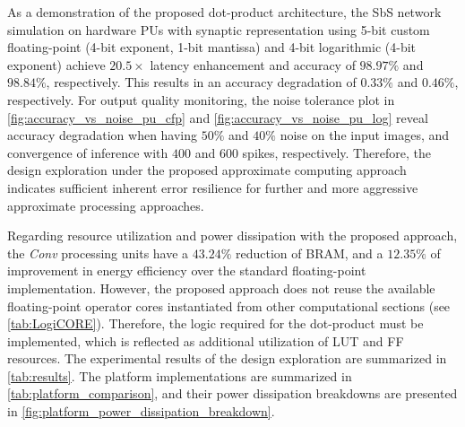As a demonstration of the proposed dot-product architecture, the SbS network simulation on hardware PUs with synaptic representation using 5-bit custom floating-point (4-bit exponent, 1-bit mantissa) and 4-bit logarithmic (4-bit exponent) achieve $20.5\times$ latency enhancement and accuracy of $98.97\%$ and $98.84\%$, respectively. This results in an accuracy degradation of $0.33\%$ and $0.46\%$, respectively. For output quality monitoring, the noise tolerance plot in \ref{fig:accuracy_vs_noise_pu_cfp} and \ref{fig:accuracy_vs_noise_pu_log} reveal accuracy degradation when having $50\%$ and $40\%$ noise on the input images, and convergence of inference with $400$ and $600$ spikes, respectively. Therefore, the design exploration under the proposed approximate computing approach indicates sufficient inherent error resilience for further and more aggressive approximate processing approaches.

Regarding resource utilization and power dissipation with the proposed approach, the \emph{Conv} processing units have a $43.24\%$ reduction of BRAM, and a $12.35\%$ of improvement in energy efficiency over the standard floating-point implementation. However, the proposed approach does not reuse the available floating-point operator cores instantiated from other computational sections (see {\ref{tab:LogiCORE}}). Therefore, the logic required for the dot-product must be implemented, which is reflected as additional utilization of LUT and FF resources. The experimental results of the design exploration are summarized in \ref{tab:results}. The platform implementations are summarized in \ref{tab:platform_comparison}, and their power dissipation breakdowns are presented in {\ref{fig:platform_power_dissipation_breakdown}}.

